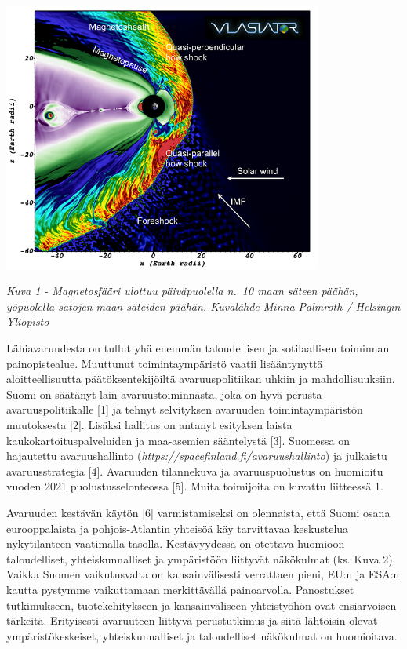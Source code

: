\documentclass[nobib,finnish,oneside,openany,notoc,a4paper]{tufte-book}
\begin{document}
\includegraphics[width=10.5cm]{image1.png}

\emph{Kuva 1 - Magnetosfääri ulottuu
päiväpuolella n.~10 maan säteen päähän, yöpuolella satojen maan säteiden
päähän. Kuvalähde Minna Palmroth / Helsingin Yliopisto}

Lähiavaruudesta on tullut yhä enemmän taloudellisen ja sotilaallisen
toiminnan painopistealue. Muuttunut toimintaympäristö vaatii
lisääntynyttä aloitteellisuutta päätöksentekijöiltä avaruuspolitiikan
uhkiin ja mahdollisuuksiin. Suomi on säätänyt lain avaruustoiminnasta,
joka on hyvä perusta avaruuspolitiikalle {[}1{]} ja tehnyt selvityksen
avaruuden toimintaympäristön muutoksesta {[}2{]}. Lisäksi hallitus on
antanyt esityksen laista kaukokartoituspalveluiden ja maa-asemien
sääntelystä {[}3{]}. Suomessa on hajautettu avaruushallinto
(\href{https://spacefinland.fi/avaruushallinto}{\emph{https://spacefinland.fi/avaruushallinto}})
ja julkaistu avaruusstrategia {[}4{]}. Avaruuden tilannekuva ja
avaruuspuolustus on huomioitu vuoden 2021 puolustusselonteossa {[}5{]}.
Muita toimijoita on kuvattu liitteessä 1.

Avaruuden kestävän käytön {[}6{]} varmistamiseksi on olennaista, että
Suomi osana eurooppalaista ja pohjois-Atlantin yhteisöä käy tarvittavaa
keskustelua nykytilanteen vaatimalla tasolla. Kestävyydessä on otettava
huomioon taloudelliset, yhteiskunnalliset ja ympäristöön liittyvät
näkökulmat (ks. Kuva 2). Vaikka Suomen vaikutusvalta on kansainvälisesti
verrattaen pieni, EU:n ja ESA:n kautta pystymme vaikuttamaan
merkittävällä painoarvolla. Panostukset tutkimukseen, tuotekehitykseen
ja kansainväliseen yhteistyöhön ovat ensiarvoisen tärkeitä. Erityisesti
avaruuteen liittyvä perustutkimus ja siitä lähtöisin olevat
ympäristökeskeiset, yhteiskunnalliset ja taloudelliset näkökulmat on
huomioitava.
\end{document}
